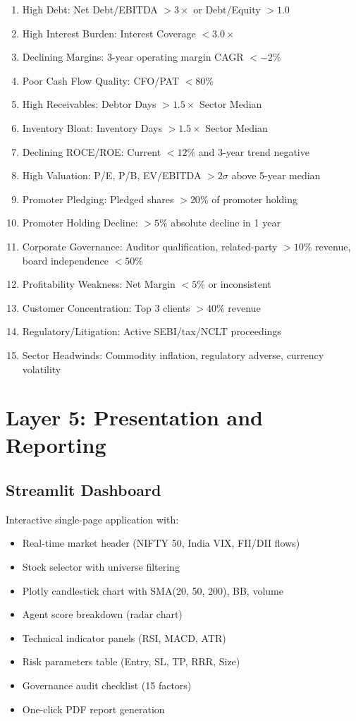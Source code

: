 \documentclass[12pt,a4paper]{report}
\begin{document}
\begin{enumerate}
\item High Debt: Net Debt/EBITDA $> 3\times$ or Debt/Equity $> 1.0$
\item High Interest Burden: Interest Coverage $< 3.0\times$
\item Declining Margins: 3-year operating margin CAGR $< -2\%$
\item Poor Cash Flow Quality: CFO/PAT $< 80\%$
\item High Receivables: Debtor Days $> 1.5\times$ Sector Median
\item Inventory Bloat: Inventory Days $> 1.5\times$ Sector Median
\item Declining ROCE/ROE: Current $< 12\%$ and 3-year trend negative
\item High Valuation: P/E, P/B, EV/EBITDA $> 2\sigma$ above 5-year median
\item Promoter Pledging: Pledged shares $> 20\%$ of promoter holding
\item Promoter Holding Decline: $> 5\%$ absolute decline in 1 year
\item Corporate Governance: Auditor qualification, related-party $> 10\%$ revenue, board independence $< 50\%$
\item Profitability Weakness: Net Margin $< 5\%$ or inconsistent
\item Customer Concentration: Top 3 clients $> 40\%$ revenue
\item Regulatory/Litigation: Active SEBI/tax/NCLT proceedings
\item Sector Headwinds: Commodity inflation, regulatory adverse, currency volatility
\end{enumerate}

\section{Layer 5: Presentation and Reporting}
\subsection{Streamlit Dashboard}
Interactive single-page application with:
\begin{itemize}
\item Real-time market header (NIFTY 50, India VIX, FII/DII flows)
\item Stock selector with universe filtering
\item Plotly candlestick chart with SMA(20, 50, 200), BB, volume
\item Agent score breakdown (radar chart)
\item Technical indicator panels (RSI, MACD, ATR)
\item Risk parameters table (Entry, SL, TP, RRR, Size)
\item Governance audit checklist (15 factors)
\item One-click PDF report generation
\end{itemize}
\end{document}
